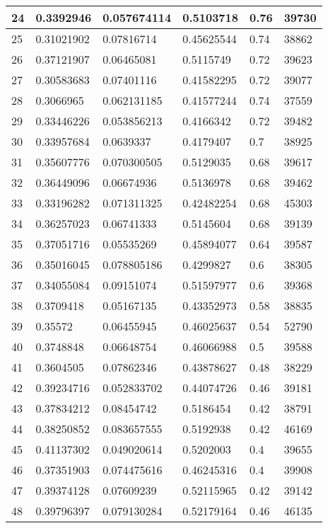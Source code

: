 \begin{longtable}{|l|l|l|l|l|l|}
24 & 0.3392946 & 0.057674114 & 0.5103718 & 0.76 & 39730 \\ \hline 
25 & 0.31021902 & 0.07816714 & 0.45625544 & 0.74 & 38862 \\ \hline 
26 & 0.37121907 & 0.06465081 & 0.5115749 & 0.72 & 39623 \\ \hline 
27 & 0.30583683 & 0.07401116 & 0.41582295 & 0.72 & 39077 \\ \hline 
28 & 0.3066965 & 0.062131185 & 0.41577244 & 0.74 & 37559 \\ \hline 
29 & 0.33446226 & 0.053856213 & 0.4166342 & 0.72 & 39482 \\ \hline 
30 & 0.33957684 & 0.0639337 & 0.4179407 & 0.7 & 38925 \\ \hline 
31 & 0.35607776 & 0.070300505 & 0.5129035 & 0.68 & 39617 \\ \hline 
32 & 0.36449096 & 0.06674936 & 0.5136978 & 0.68 & 39462 \\ \hline 
33 & 0.33196282 & 0.071311325 & 0.42482254 & 0.68 & 45303 \\ \hline 
34 & 0.36257023 & 0.06741333 & 0.5145604 & 0.68 & 39139 \\ \hline 
35 & 0.37051716 & 0.05535269 & 0.45894077 & 0.64 & 39587 \\ \hline 
36 & 0.35016045 & 0.078805186 & 0.4299827 & 0.6 & 38305 \\ \hline 
37 & 0.34055084 & 0.09151074 & 0.51597977 & 0.6 & 39368 \\ \hline 
38 & 0.3709418 & 0.05167135 & 0.43352973 & 0.58 & 38835 \\ \hline 
39 & 0.35572 & 0.06455945 & 0.46025637 & 0.54 & 52790 \\ \hline 
40 & 0.3748848 & 0.06648754 & 0.46066988 & 0.5 & 39588 \\ \hline 
41 & 0.3604505 & 0.07862346 & 0.43878627 & 0.48 & 38229 \\ \hline 
42 & 0.39234716 & 0.052833702 & 0.44074726 & 0.46 & 39181 \\ \hline 
43 & 0.37834212 & 0.08454742 & 0.5186454 & 0.42 & 38791 \\ \hline 
44 & 0.38250852 & 0.083657555 & 0.5192938 & 0.42 & 46169 \\ \hline 
45 & 0.41137302 & 0.049020614 & 0.5202003 & 0.4 & 39655 \\ \hline 
46 & 0.37351903 & 0.074475616 & 0.46245316 & 0.4 & 39908 \\ \hline 
47 & 0.39374128 & 0.07609239 & 0.52115965 & 0.42 & 39142 \\ \hline 
48 & 0.39796397 & 0.079130284 & 0.52179164 & 0.46 & 46135 \\ \hline 

\end{longtable}
